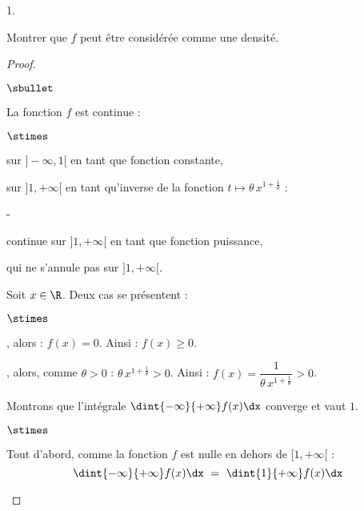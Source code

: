 \documentclass[11pt]{article}%
\begin{document}
\begin{noliste}{1.}
  \setlength{\itemsep}{4mm}
\item Montrer que $f$ peut être considérée comme une densité.
  \begin{proof}~
    \begin{noliste}{$\sbullet$}
    \item La fonction $f$ est continue :
      \begin{noliste}{$\stimes$}
      \item sur $]-\infty, 1[$ en tant que fonction constante,
        
      \item sur $]1,+\infty[$ en tant qu'inverse de la fonction
        $t \mapsto \theta \, x^{1+ \frac{1}{\theta}}$ :
        \begin{noliste}{-}
        \item continue sur $]1,+\infty[$ en tant que fonction puissance,
          
        \item qui ne s'annule pas sur $]1,+\infty[$.
        \end{noliste}
      \end{noliste}
      
    \item Soit $x \in \R$. Deux cas se présentent :
      \begin{noliste}{$\stimes$}
      \item \dashuline{si $x \in \ ]-\infty, 1[$}, alors :
        $f(x)=0$. Ainsi : $f(x) \geq 0$.
        
      \item \dashuline{si $x \in [1, +\infty[$}, alors, comme $\theta
        >0$ : $\theta \, x^{1+ \frac{1}{\theta}} >0$. Ainsi : $f(x) =
        \dfrac{1}{\theta \, x^{1+ \frac{1}{\theta}}} >0$.
      \end{noliste}
      
    \item Montrons que l'intégrale $\dint{-\infty}{+\infty} f(x) \dx$
      converge et vaut $1$.
      \begin{noliste}{$\stimes$}
      \item Tout d'abord, comme la fonction $f$ est nulle en dehors de
        $[1,+\infty[$ :
        \[
          \dint{-\infty}{+\infty} f(x) \dx \ = \ \dint{1}{+\infty}
          f(x) \dx
        \]
        

\end{noliste}
\end{noliste}
\end{proof}
\end{noliste}
\end{document}
